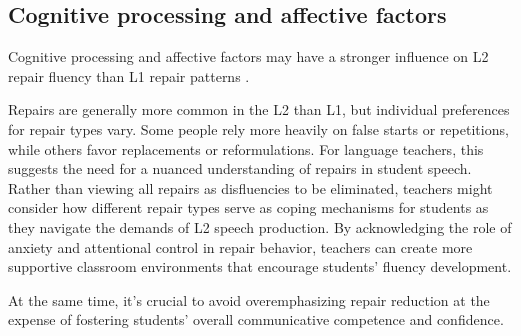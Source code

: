 \subsection{Cognitive processing and affective factors}

Cognitive processing and affective factors may have a stronger influence on L2 repair fluency than L1 repair patterns \citep{Peltonen2024}.

Repairs are generally more common in the L2 than L1, but individual preferences for repair types vary. Some people rely more heavily on false starts or repetitions, while others favor replacements or reformulations. For language teachers, this suggests the need for a nuanced understanding of repairs in student speech. Rather than viewing all repairs as disfluencies to be eliminated, teachers might consider how different repair types serve as coping mechanisms for students as they navigate the demands of L2 speech production. By acknowledging the role of anxiety and attentional control in repair behavior, teachers can create more supportive classroom environments that encourage students' fluency development.

At the same time, it's crucial to avoid overemphasizing repair reduction at the expense of fostering students' overall communicative competence and confidence.


